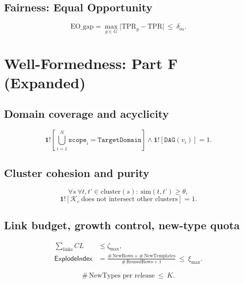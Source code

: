 \documentclass[conference]{IEEEtran}
\begin{document}
\subsection{Fairness: Equal Opportunity}
\begin{equation}
\label{eq:eo-gap}
\mathrm{EO\_gap}=\max_{g\in G}\big|\mathrm{TPR}_g-\mathrm{TPR}\big|\ \le\ \delta_{\mathrm{eo}}.
\end{equation}

\section{Well-Formedness: Part F (Expanded)}
\subsection{Domain coverage and acyclicity}
\begin{equation}
\label{eq:f-coverage-dag}
\mathbf{1}!\left[\bigcup_{i=1}^{N}\mathtt{scope}_{i}=\mathtt{TargetDomain}\right]
\wedge
\mathbf{1}!\left[\mathtt{DAG}(v_i)\right]=1.
\end{equation}

\subsection{Cluster cohesion and purity}
\begin{equation}
\label{eq:f-cluster-thresh}
\forall s\ \forall t,t’\in \mathrm{cluster}(s):\ \mathrm{sim}(t,t’)\ge \theta,
\end{equation}
\begin{equation}
\label{eq:f-knowledge-purity}
\mathbf{1}!\left[\mathcal{K}_{c}\ \text{does not intersect other clusters}\right]=1.
\end{equation}

\subsection{Link budget, growth control, new-type quota}
\begin{equation}\label{eq:link-budget}
\begin{aligned}
\sum\nolimits_{\text{links}} CL &\le \zeta_{\max},\\
\mathsf{ExplodeIndex} &=
\tfrac{\#\,\mathrm{NewRows}+\#\,\mathrm{NewTemplates}}{\#\,\mathrm{ReusedRows}+1}
\ \le\ \xi_{\max}.
\end{aligned}
\end{equation}

\begin{equation}
\label{eq:new-types}
\#\,\text{NewTypes per release}\ \le\ K.
\end{equation}
\end{document}
